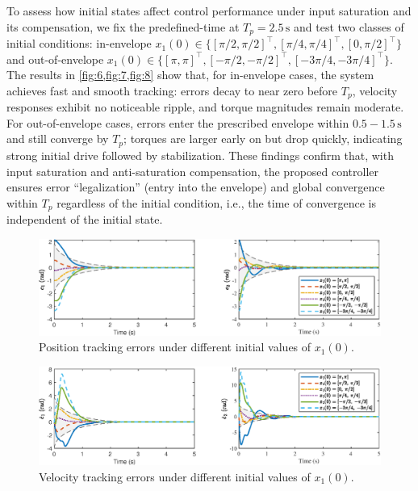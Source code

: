\documentclass[pdflatex,sn-mathphys-num]{sn-jnl}%
\theoremstyle{thmstyleone}%
\theoremstyle{thmstyletwo}%
\theoremstyle{thmstylethree}%
\begin{document}
To assess how initial states affect control performance under input saturation and its compensation, we fix the predefined-time at $T_p=2.5\,\mathrm{s}$ and test two classes of initial conditions: in-envelope $x_1(0)\in\{[\pi/2,\pi/2]^{\!\top},[\pi/4,\pi/4]^{\!\top},[0,\pi/2]^{\!\top}\}$ and out-of-envelope $x_1(0)\in\{[\pi,\pi]^{\!\top},[-\pi/2,-\pi/2]^{\!\top},[-3\pi/4,-3\pi/4]^{\!\top}\}$. The results in \cref{fig:6,fig:7,fig:8} show that, for in-envelope cases, the system achieves fast and smooth tracking: errors decay to near zero before $T_p$, velocity responses exhibit no noticeable ripple, and torque magnitudes remain moderate. For out-of-envelope cases, errors enter the prescribed envelope within $0.5\!-\!1.5\,\mathrm{s}$ and still converge by $T_p$; torques are larger early on but drop quickly, indicating strong initial drive followed by stabilization. These findings confirm that, with input saturation and anti-saturation compensation, the proposed controller ensures error “legalization” (entry into the envelope) and global convergence within $T_p$ regardless of the initial condition, i.e., the time of convergence is independent of the initial state.

\begin{figure}[H]
	\centering
	\includegraphics[width=0.9\linewidth]{fig6.eps}
	\caption{Position tracking errors under different initial values of \(x_1(0)\).}
	\label{fig:6}
\end{figure}

\begin{figure}[H]
	\centering
	\includegraphics[width=0.9\linewidth]{fig7.eps}
	\caption{Velocity tracking errors under different initial values of \(x_1(0)\).}
	\label{fig:7}
\end{figure}
\end{document}

